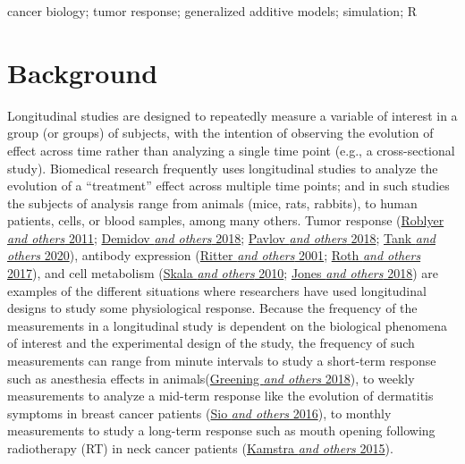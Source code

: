 \documentclass[
]{article}
\begin{document}
cancer biology; tumor response; generalized additive models; simulation; R

\hypertarget{background}{%
\section{Background}\label{background}}

Longitudinal studies are designed to repeatedly measure a variable of interest in a group (or groups) of subjects, with the intention of observing the evolution of effect across time rather than analyzing a single time point (e.g., a cross-sectional study). Biomedical research frequently uses longitudinal studies to analyze the evolution of a ``treatment'' effect across multiple time points; and in such studies the subjects of analysis range from animals (mice, rats, rabbits), to human patients, cells, or blood samples, among many others. Tumor response (\protect\hyperlink{ref-roblyer2011}{Roblyer \emph{and others} 2011}; \protect\hyperlink{ref-demidov2018}{Demidov \emph{and others} 2018}; \protect\hyperlink{ref-pavlov2018}{Pavlov \emph{and others} 2018}; \protect\hyperlink{ref-tank2020}{Tank \emph{and others} 2020}), antibody expression (\protect\hyperlink{ref-ritter2001}{Ritter \emph{and others} 2001}; \protect\hyperlink{ref-roth2017}{Roth \emph{and others} 2017}), and cell metabolism (\protect\hyperlink{ref-skala2010}{Skala \emph{and others} 2010}; \protect\hyperlink{ref-jones2018}{Jones \emph{and others} 2018}) are examples of the different situations where researchers have used longitudinal designs to study some physiological response. Because the frequency of the measurements in a longitudinal study is dependent on the biological phenomena of interest and the experimental design of the study, the frequency of such measurements can range from minute intervals to study a short-term response such as anesthesia effects in animals(\protect\hyperlink{ref-greening2018}{Greening \emph{and others} 2018}), to weekly measurements to analyze a mid-term response like the evolution of dermatitis symptoms in breast cancer patients (\protect\hyperlink{ref-sio2016}{Sio \emph{and others} 2016}), to monthly measurements to study a long-term response such as mouth opening following radiotherapy (RT) in neck cancer patients (\protect\hyperlink{ref-kamstra2015}{Kamstra \emph{and others} 2015}).
\end{document}
